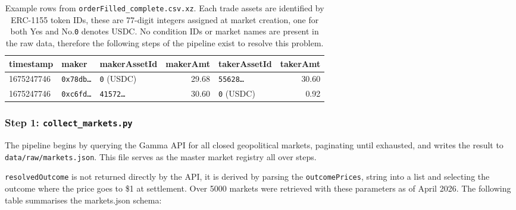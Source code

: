 \documentclass[11pt]{article}
\begin{document}
\begin{table}[H]
\centering
\caption{Example rows from \texttt{orderFilled\_complete.csv.xz}.
         Each trade assets are identified by ERC-1155 token IDs, these are
         77-digit integers assigned at market creation, one for both Yes and No.\texttt{0} denotes USDC. 
         No condition IDs or market names are present in
         the raw data, therefore the following steps of the pipeline exist to resolve this problem.}
\label{tab:raw_snapshot}
\small
\begin{tabularx}{\textwidth}{l l l r l r}
\toprule
\textbf{timestamp} & \textbf{maker} & \textbf{makerAssetId}
    & \textbf{makerAmt} & \textbf{takerAssetId} & \textbf{takerAmt} \\
\midrule
1675247746 & \texttt{0x78db{\ldots}} & \texttt{0} (USDC)
    & 29.68 & \texttt{55628{\ldots}} & 30.60 \\
1675247746 & \texttt{0xc6fd{\ldots}} & \texttt{41572{\ldots}}
    & 30.60 & \texttt{0} (USDC) & 0.92 \\
\bottomrule
\end{tabularx}
\end{table}


\subsubsection*{Step 1: \texttt{collect\_markets.py}}
The pipeline begins by querying the Gamma API for all closed geopolitical markets, paginating until exhausted, and writes the result to \texttt{data/raw/markets.json}.
This file serves as the master market registry all over steps.



\texttt{resolvedOutcome} is not returned directly by the API, it is 
derived by parsing the \texttt{outcomePrices}, string into a list and 
selecting the outcome where the price goes to \$1 at settlement. Over 5000 markets were retrieved with these parameters as of April 2026. The following table summarises the markets.json schema:
\end{document}

